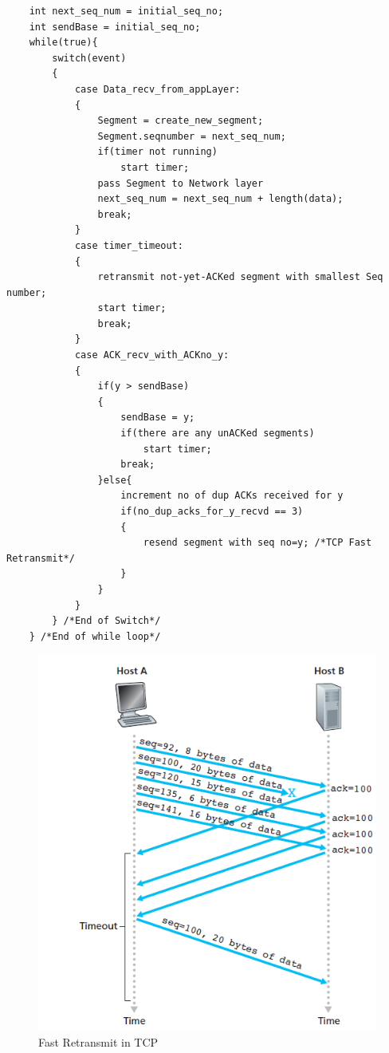 \documentclass{article}
\theoremstyle{plain}
\theoremstyle{definition}
\begin{document}
\begin{verbatim}
    int next_seq_num = initial_seq_no;
    int sendBase = initial_seq_no;
    while(true){
        switch(event)
        {
            case Data_recv_from_appLayer:
            {
                Segment = create_new_segment;
                Segment.seqnumber = next_seq_num;
                if(timer not running)
                    start timer;
                pass Segment to Network layer
                next_seq_num = next_seq_num + length(data);
                break;
            }
            case timer_timeout:
            {
                retransmit not-yet-ACKed segment with smallest Seq number;
                start timer;
                break;
            }
            case ACK_recv_with_ACKno_y:
            {
                if(y > sendBase)
                {
                    sendBase = y;
                    if(there are any unACKed segments)
                        start timer;
                    break;
                }else{
                    increment no of dup ACKs received for y
                    if(no_dup_acks_for_y_recvd == 3)
                    {
                        resend segment with seq no=y; /*TCP Fast Retransmit*/
                    }
                }
            }
        } /*End of Switch*/
    } /*End of while loop*/
\end{verbatim}

\begin{figure}[!ht]
    \centering
    \includegraphics[scale=0.7]{cn4.png}
    \caption{Fast Retransmit in TCP}
    \label{fig:my_label_x}
\end{figure}
\end{document}
